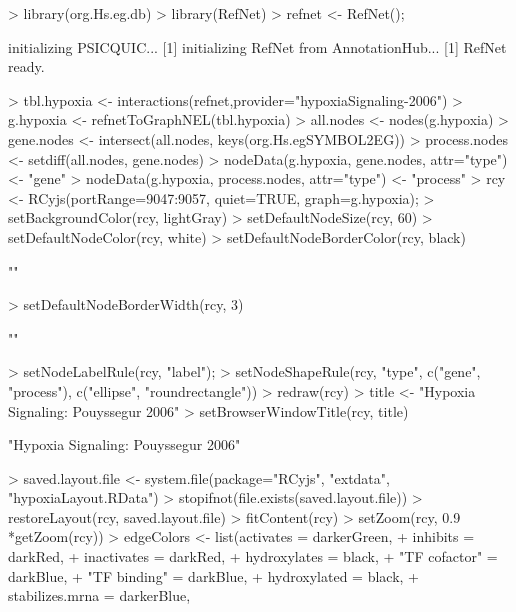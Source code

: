 \documentclass{article}
\begin{document}
\begin{Schunk}
\begin{Sinput}
> library(org.Hs.eg.db)
> library(RefNet)
> refnet <- RefNet();
\end{Sinput}
\begin{Soutput}
[1] initializing PSICQUIC...
[1] initializing RefNet from AnnotationHub...
[1] RefNet ready.
\end{Soutput}
\begin{Sinput}
> tbl.hypoxia <- interactions(refnet,provider="hypoxiaSignaling-2006")
> g.hypoxia <- refnetToGraphNEL(tbl.hypoxia)
> all.nodes <- nodes(g.hypoxia)
> gene.nodes <- intersect(all.nodes, keys(org.Hs.egSYMBOL2EG))
> process.nodes <- setdiff(all.nodes, gene.nodes)
> nodeData(g.hypoxia, gene.nodes, attr="type") <- "gene"
> nodeData(g.hypoxia, process.nodes, attr="type") <- "process"
> rcy <- RCyjs(portRange=9047:9057, quiet=TRUE, graph=g.hypoxia);
> setBackgroundColor(rcy, lightGray)
> setDefaultNodeSize(rcy, 60)
> setDefaultNodeColor(rcy, white)
> setDefaultNodeBorderColor(rcy, black)
\end{Sinput}
\begin{Soutput}
[1] ""
\end{Soutput}
\begin{Sinput}
> setDefaultNodeBorderWidth(rcy, 3)
\end{Sinput}
\begin{Soutput}
[1] ""
\end{Soutput}
\begin{Sinput}
> setNodeLabelRule(rcy, "label");
> setNodeShapeRule(rcy, "type", c("gene", "process"), c("ellipse", "roundrectangle"))
> redraw(rcy)
> title <- "Hypoxia Signaling: Pouyssegur 2006"
> setBrowserWindowTitle(rcy, title)
\end{Sinput}
\begin{Soutput}
[1] "Hypoxia Signaling: Pouyssegur 2006"
\end{Soutput}
\begin{Sinput}
> saved.layout.file <- system.file(package="RCyjs", "extdata", "hypoxiaLayout.RData")
> stopifnot(file.exists(saved.layout.file))
> restoreLayout(rcy, saved.layout.file)
> fitContent(rcy)
> setZoom(rcy, 0.9 *getZoom(rcy))
> edgeColors <- list(activates = darkerGreen,
+                    inhibits = darkRed,
+                    inactivates = darkRed,
+                    hydroxylates = black,
+                    "TF cofactor" = darkBlue,
+                    "TF binding" = darkBlue,
+                    hydroxylated = black,
+                    stabilizes.mrna = darkerBlue,

\end{Sinput}
\end{Schunk}
\end{document}
